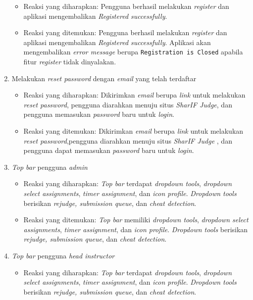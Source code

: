 \begin{enumerate}
	 	\begin{itemize}
	 		\item Reaksi yang diharapkan: Pengguna berhasil melakukan \textit{register} dan aplikasi mengembalikan \textit{Registered successfully}.
	 		\item Reaksi yang ditemukan: Pengguna berhasil melakukan \textit{register} dan aplikasi mengembalikan \textit{Registered successfully}. Aplikasi akan mengembalikan \textit{error message} berupa \texttt{Registration is Closed} apabila fitur \textit{register} tidak dinyalakan.
	 	\end{itemize}
	 \item Melakukan \textit{reset password} dengan \textit{email} yang telah terdaftar
	 	\begin{itemize}
	 		\item Reaksi yang diharapkan: Dikirimkan \textit{email} berupa \textit{link} untuk melakukan \textit{reset password}, pengguna diarahkan menuju situs \textit{SharIF Judge}, dan pengguna memasukan \textit{password} baru untuk \textit{login}.
	 		\item Reaksi yang ditemukan: Dikirimkan \textit{email} berupa \textit{link} untuk melakukan \textit{reset password},pengguna diarahkan menuju situs \textit{SharIF Judge} , dan pengguna dapat memasukan \textit{password} baru untuk \textit{login}.
	 	\end{itemize}
	 \item \textit{Top bar} pengguna \textit{admin}
	 \begin{itemize}
	 	\item Reaksi yang diharapkan: \textit{Top bar} terdapat \textit{dropdown tools}, \textit{dropdown select assignments}, \textit{timer assignment}, dan \textit{icon profile}. \textit{Dropdown tools} berisikan \textit{rejudge, submission queue}, dan \textit{cheat detection}.
	 	\item Reaksi yang ditemukan: \textit{Top bar} memiliki \textit{dropdown tools}, \textit{ dropdown select assignments}, \textit{timer assignment}, dan \textit{icon profile}. \textit{Dropdown tools} berisikan \textit{rejudge, submission queue}, dan \textit{cheat detection}.
	 \end{itemize}
	 \item \textit{Top bar} pengguna \textit{head instructor}
	 \begin{itemize}
	 	\item Reaksi yang diharapkan: \textit{Top bar} terdapat \textit{dropdown tools}, \textit{dropdown select assignments}, \textit{timer assignment}, dan \textit{icon profile}. \textit{Dropdown tools} berisikan \textit{rejudge, submission queue}, dan \textit{cheat detection}.

\end{itemize}
\end{enumerate}
